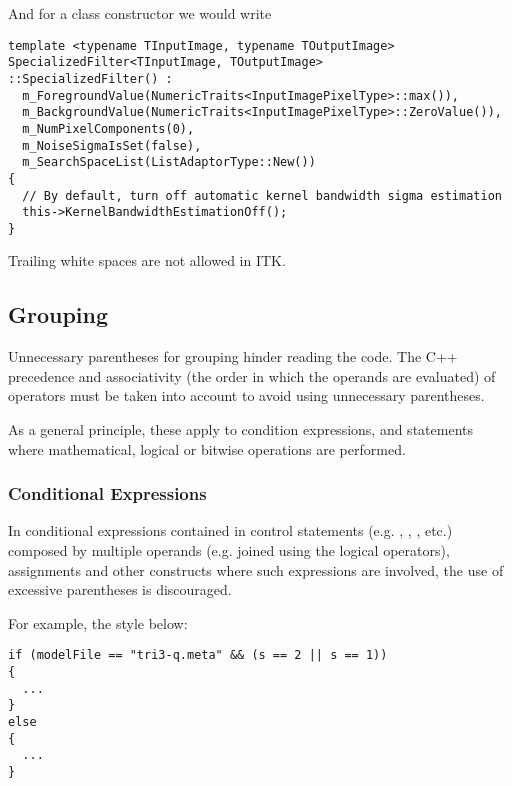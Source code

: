 And for a class constructor we would write

\small
\begin{verbatim}
template <typename TInputImage, typename TOutputImage>
SpecializedFilter<TInputImage, TOutputImage>
::SpecializedFilter() :
  m_ForegroundValue(NumericTraits<InputImagePixelType>::max()),
  m_BackgroundValue(NumericTraits<InputImagePixelType>::ZeroValue()),
  m_NumPixelComponents(0),
  m_NoiseSigmaIsSet(false),
  m_SearchSpaceList(ListAdaptorType::New())
{
  // By default, turn off automatic kernel bandwidth sigma estimation
  this->KernelBandwidthEstimationOff();
}
\end{verbatim}
\normalsize

Trailing white spaces are not allowed in ITK.


\subsection{Grouping}
\label{subsec:Grouping}

Unnecessary parentheses for grouping hinder reading the code.
The C++ precedence and associativity (the order in which the operands are
evaluated) of operators must be taken into account to avoid using unnecessary
parentheses.

As a general principle, these apply to condition expressions, and statements
where mathematical, logical or bitwise operations are performed.


\subsubsection{Conditional Expressions}
\label{subsubsec:ConditionalExpressions}

In conditional expressions contained in control statements (e.g. ,
, , etc.) composed by multiple operands (e.g. joined
using the logical operators), assignments and other constructs where such
expressions are involved, the use of excessive parentheses is discouraged.

For example, the style below:

\small
\begin{verbatim}
if (modelFile == "tri3-q.meta" && (s == 2 || s == 1))
{
  ...
}
else
{
  ...
}
\end{verbatim}
\normalsize

